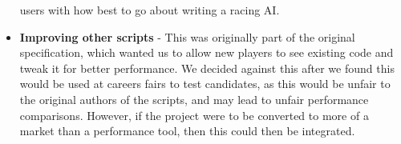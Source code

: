 \begin{itemize}
        users with how best to go about writing a racing AI.
    \item
        \textbf{Improving other scripts} - This was originally part of the
        original specification, which wanted us to allow new players to see
        existing code and tweak it for better performance. We decided against
        this after we found this would be used at careers fairs to test
        candidates, as this would be unfair to the original authors of the
        scripts, and may lead to unfair performance comparisons. However, if the
        project were to be converted to more of a market than a performance
        tool, then this could then be integrated.
\end{itemize}
